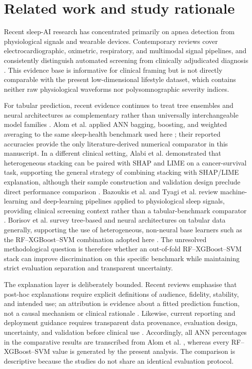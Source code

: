\documentclass{elektr}
\begin{document}
\section{Related work and study rationale}
Recent sleep-AI research has concentrated primarily on apnea detection from physiological signals and wearable devices. Contemporary reviews cover electrocardiographic, oximetric, respiratory, and multimodal signal pipelines, and consistently distinguish automated screening from clinically adjudicated diagnosis \cite{bazoukis2023,tyagi2023,abdalrazaq2024,giorgi2025}. This evidence base is informative for clinical framing but is not directly comparable with the present low-dimensional lifestyle dataset, which contains neither raw physiological waveforms nor polysomnographic severity indices.

For tabular prediction, recent evidence continues to treat tree ensembles and neural architectures as complementary rather than universally interchangeable model families \cite{borisov2024}. Alom et al. applied ANN bagging, boosting, and weighted averaging to the same sleep-health benchmark used here \cite{alom2024}; their reported accuracies provide the only literature-derived numerical comparator in this manuscript. In a different clinical setting, Alabi et al. demonstrated that heterogeneous stacking can be paired with SHAP and LIME on a cancer-survival task, supporting the general strategy of combining stacking with SHAP/LIME explanation, although their sample construction and validation design preclude direct performance comparison \cite{alabi2023}. Bazoukis et al. and Tyagi et al. review machine-learning and deep-learning pipelines applied to physiological sleep signals, providing clinical screening context rather than a tabular-benchmark comparator \cite{bazoukis2023,tyagi2023}. Borisov et al. survey tree-based and neural architectures on tabular data generally, supporting the use of heterogeneous, non-neural base learners such as the RF--XGBoost--SVM combination adopted here \cite{borisov2024}. The unresolved methodological question is therefore whether an out-of-fold RF--XGBoost--SVM stack can improve discrimination on this specific benchmark while maintaining strict evaluation separation and transparent uncertainty.

The explanation layer is deliberately bounded. Recent reviews emphasise that post-hoc explanations require explicit definitions of audience, fidelity, stability, and intended use; an attribution is evidence about a fitted prediction function, not a causal mechanism or clinical rationale \cite{jung2023,allen2024}. Likewise, current reporting and deployment guidance requires transparent data provenance, evaluation design, uncertainty, and validation before clinical use \cite{tripodai2024,futureai2025}. Accordingly, all ANN percentages in the comparative results are transcribed from Alom et al. \cite{alom2024}, whereas every RF--XGBoost--SVM value is generated by the present analysis. The comparison is descriptive because the studies do not share an identical evaluation protocol.
\end{document}
